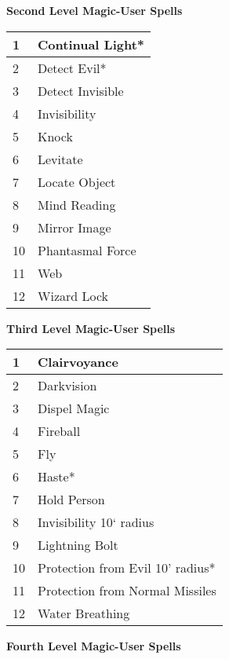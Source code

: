 \documentclass[a4paper,twoside,openany,10pt]{book}
\begin{document}
\begin{multicols}{2}
{\large \textbf{Second Level Magic-User Spells}}\\

\begin{tabularx}{0.45\textwidth}{@{}ll@{}}
1 & Continual Light* \\\toprule
2 & Detect Evil* \\\hline
3 & Detect Invisible \\\hline
4 & Invisibility \\\hline
5 & Knock \\\hline
6 & Levitate \\\hline
7 & Locate Object \\\hline
8 & Mind Reading \\\hline
9 & Mirror Image \\\hline
10 & Phantasmal Force \\\hline
11 & Web \\\hline
12 & Wizard Lock \\\bottomrule
\end{tabularx}\bigskip

{\large \textbf{Third Level Magic-User Spells}}\\

\begin{tabularx}{0.45\textwidth}{@{}ll@{}}
1 & Clairvoyance \\\toprule
2 & Darkvision \\\hline
3 & Dispel Magic \\\hline
4 & Fireball \\\hline
5 & Fly \\\hline
6 & Haste* \\\hline
7 & Hold Person \\\hline
8 & Invisibility 10` radius \\\hline
9 & Lightning Bolt \\\hline
10 & Protection from Evil 10' radius* \\\hline
11 & Protection from Normal Missiles \\\hline
12 & Water Breathing \\\bottomrule
\end{tabularx}\bigskip

{\large \textbf{Fourth Level Magic-User Spells}}\\


\end{multicols}
\end{document}
